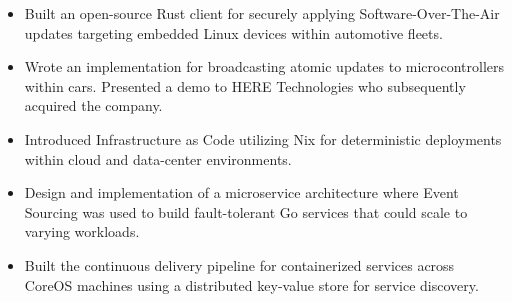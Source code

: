 \documentclass[12pt,a4paper,sans]{moderncv}
\begin{document}
\vspace{0.5em}
{
  \begin{itemize}
  \setlength\itemsep{0.5em}
  \vspace{-0.5em}
  \item
    Built an open-source Rust client for securely applying Software-Over-The-Air updates targeting embedded Linux devices within automotive fleets.
  \item
    Wrote an implementation for broadcasting atomic updates to microcontrollers within cars. Presented a demo to HERE Technologies who subsequently acquired the company.
  \item
    Introduced Infrastructure as Code utilizing Nix for deterministic deployments within cloud and data-center environments.
  \end{itemize}
  \vspace{0.5em}
}

\vspace{0.5em}

\vspace{0.5em}
{
  \begin{itemize}
  \setlength\itemsep{0.5em}
  \vspace{-0.5em}
  \item
    Design and implementation of a microservice architecture where Event Sourcing was used to build fault-tolerant Go services that could scale to varying workloads.
  \item
    Built the continuous delivery pipeline for containerized services across CoreOS machines using a distributed key-value store for service discovery.
  \end{itemize}
  \vspace{0.5em}
}

\vspace{0.5em}
\end{document}
